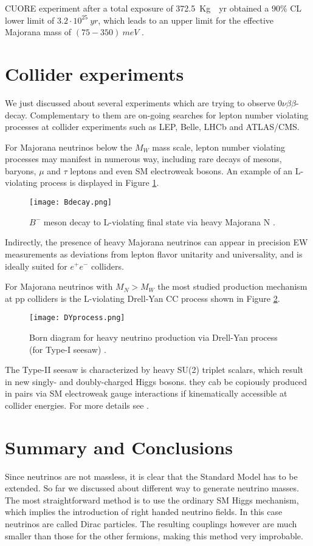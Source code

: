 \documentclass{subnucbo}
\begin{document}
CUORE experiment after a total exposure of \SI{372.5}{Kg\cdot yr} obtained a 90\% CL lower limit of $3.2\cdot10^{25}\SI{}{yr}$, which leads to an upper limit for the effective Majorana mass of $(75-350)\SI{}{meV}$ \cite{ref:cuore}.

\section{Collider experiments}
We just discussed about several experiments which are trying to observe $0\nu\beta\beta$-decay. Complementary to them are on-going searches for lepton number violating processes at collider experiments such as LEP, Belle, LHCb and ATLAS/CMS.

For Majorana neutrinos below the $M_W$ mass scale, lepton number violating processes may manifest in numerous way, including rare decays of mesons, baryons, $\mu$ and $\tau$ leptons and even SM electroweak bosons. An example of an L-violating process is displayed in Figure \ref{fig:Lviol}.
\begin{figure}
\centering
\texttt{[image: Bdecay.png]}
\caption{$B^-$ meson decay to L-violating final state via heavy Majorana N \cite{ref:front}.}
\label{fig:Lviol}
\end{figure}
Indirectly, the presence of heavy Majorana neutrinos can appear in precision EW measurements as deviations from lepton flavor unitarity and universality,  and is ideally suited for $e^+e^-$ colliders.

For Majorana neutrinos with $M_N>M_W$ the most studied production mechanism at pp colliders is the L-violating Drell-Yan CC process shown in Figure \ref{fig:DY}.
\begin{figure}
\centering
\texttt{[image: DYprocess.png]}
\caption{Born diagram for heavy neutrino production via Drell-Yan process (for Type-I seesaw)  \cite{ref:front}.}
\label{fig:DY}
\end{figure}
The Type-II seesaw is characterized by heavy SU(2) triplet scalars, which result in new singly- and doubly-charged Higgs bosons. they cab be copiously produced in pairs via SM electroweak gauge interactions if kinematically accessible at collider energies.
For more details see \cite{ref:front}. 

\section{Summary and Conclusions}
Since neutrinos are not massless, it is clear that the Standard Model has to be extended. So far we discussed about different way to generate neutrino masses. The most straightforward method is to use the ordinary SM Higgs mechanism, which implies the introduction of right handed neutrino fields. In this case neutrinos are called Dirac particles. The resulting couplings however are much smaller than those for the other fermions, making this method very improbable.
\end{document}

